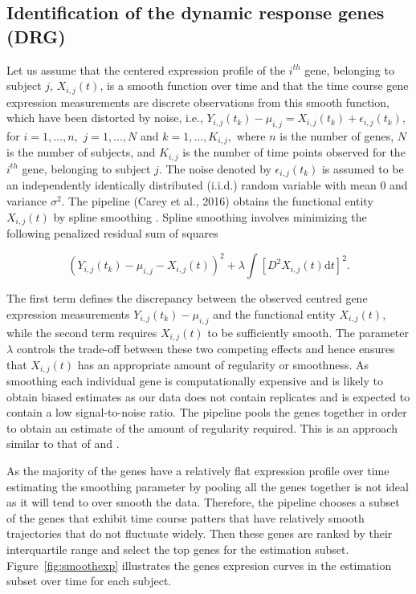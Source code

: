 \subsection{Identification of the dynamic response genes (DRG)}
\label{section:identification_of_drgs}

Let us assume that the centered expression profile of the $i^{th}$ gene, belonging to subject $j$, $X_{i,j}(t)$, is a smooth function over time and that the time course gene expression measurements are discrete observations from this smooth function, which have been distorted by noise, i.e., $Y_{i,j}(t_{k}) -\mu_{i,j} =X_{i,j}(t_{k})+\epsilon_{i,j}(t_{k})$, for $i=1,\ldots,n,$ $j=1,\ldots,N$ and $k=1,\ldots,K_{i,j},$ where $n$ is the number of genes, $N$ is the number of subjects, and $K_{i,j}$ is the number of time points observed for the $i^{th}$ gene, belonging to subject $j$. The noise denoted by $\epsilon_{i,j}(t_{k})$ is assumed to be an independently identically distributed (i.i.d.) random variable with mean $0$ and variance $\sigma^{2}$. The pipeline (Carey et al., 2016) obtains the functional entity $X_{i,j}(t)$ by spline smoothing \citep{green1993nonparametric,silverman2005functional}. Spline smoothing involves minimizing the following penalized residual sum of squares 

\begin{equation}
\label{eq:res_sum_squares}
(Y_{i,j}(t_{k}) -\mu_{i,j} - X_{i,j}(t))^{2} + \lambda \int \left[D^{2} X_{i,j}(t) \textrm{d}t\right]^{2}.
\end{equation}

The first term defines the discrepancy between the observed centred gene expression measurements $Y_{i,j}(t_{k}) -\mu_{i,j}$ and the functional entity $X_{i,j}(t),$ while the second term requires $X_{i,j}(t)$ to be sufficiently smooth. The parameter $\lambda$ controls the trade-off between these two competing effects and hence ensures that $X_{i,j}(t)$ has an appropriate amount of regularity or smoothness. As smoothing each individual gene is computationally expensive and is likely to obtain biased estimates as our data does not contain replicates and is expected to contain a low signal-to-noise ratio. The pipeline pools the genes together in order to obtain an estimate of the amount of regularity required. This is an approach similar to that of \cite{yao2005functional} and \cite{wu2013more}.

As the majority of the genes have a relatively flat expression profile over time estimating the smoothing parameter by pooling all the genes together is not ideal as it will tend to over smooth the data. Therefore, the pipeline chooses a subset of the genes that exhibit time course patters that have relatively smooth trajectories that do not fluctuate widely. Then these genes are ranked by their interquartile range and select the top genes for the estimation subset. Figure~\ref{fig:smoothexp} illustrates the genes expresion curves in the estimation subset over time for each subject. 

